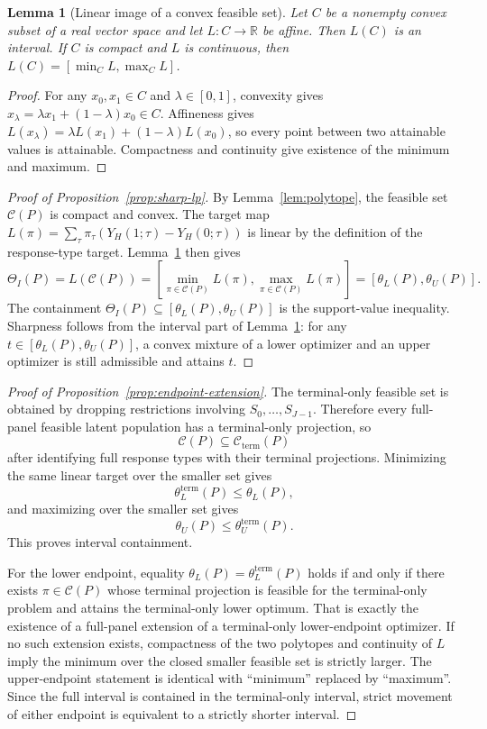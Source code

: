 \documentclass[11pt]{article}
\newcommand{\R}{\mathbb{R}}
\theoremstyle{definition}
\theoremstyle{plain}
\newtheorem{lemma}{Lemma}
\theoremstyle{remark}
\begin{document}
\begin{lemma}[Linear image of a convex feasible set]\label{lem:linear-image}
Let \(C\) be a nonempty convex subset of a real vector space and let \(L:C\to\R\) be affine.  Then \(L(C)\) is an interval.  If \(C\) is compact and \(L\) is continuous, then \(L(C)=[\min_C L,\max_C L]\).
\end{lemma}

\begin{proof}
For any \(x_0,x_1\in C\) and \(\lambda\in[0,1]\), convexity gives \(x_\lambda=\lambda x_1+(1-\lambda)x_0\in C\).  Affineness gives \(L(x_\lambda)=\lambda L(x_1)+(1-\lambda)L(x_0)\), so every point between two attainable values is attainable.  Compactness and continuity give existence of the minimum and maximum.
\end{proof}

\begin{proof}[Proof of Proposition~\ref{prop:sharp-lp}]
By Lemma~\ref{lem:polytope}, the feasible set \(\mathcal C(P)\) is compact and convex.  The target map \(L(\pi)=\sum_\tau\pi_\tau(Y_H(1;\tau)-Y_H(0;\tau))\) is linear by the definition of the response-type target.  Lemma~\ref{lem:linear-image} then gives
\[
  \Theta_I(P)
  =
  L(\mathcal C(P))
  =
  [\min_{\pi\in\mathcal C(P)}L(\pi),\max_{\pi\in\mathcal C(P)}L(\pi)]
  =
  [\theta_L(P),\theta_U(P)].
\]
The containment \(\Theta_I(P)\subseteq[\theta_L(P),\theta_U(P)]\) is the support-value inequality.  Sharpness follows from the interval part of Lemma~\ref{lem:linear-image}: for any \(t\in[\theta_L(P),\theta_U(P)]\), a convex mixture of a lower optimizer and an upper optimizer is still admissible and attains \(t\).
\end{proof}

\begin{proof}[Proof of Proposition~\ref{prop:endpoint-extension}]
The terminal-only feasible set is obtained by dropping restrictions involving \(S_0,\ldots,S_{J-1}\).  Therefore every full-panel feasible latent population has a terminal-only projection, so
\[
  \mathcal C(P)\subseteq \mathcal C_{\mathrm{term}}(P)
\]
after identifying full response types with their terminal projections.  Minimizing the same linear target over the smaller set gives
\[
  \theta_L^{\mathrm{term}}(P)
  \le
  \theta_L(P),
\]
and maximizing over the smaller set gives
\[
  \theta_U(P)
  \le
  \theta_U^{\mathrm{term}}(P).
\]
This proves interval containment.

For the lower endpoint, equality \(\theta_L(P)=\theta_L^{\mathrm{term}}(P)\) holds if and only if there exists \(\pi\in\mathcal C(P)\) whose terminal projection is feasible for the terminal-only problem and attains the terminal-only lower optimum.  That is exactly the existence of a full-panel extension of a terminal-only lower-endpoint optimizer.  If no such extension exists, compactness of the two polytopes and continuity of \(L\) imply the minimum over the closed smaller feasible set is strictly larger.  The upper-endpoint statement is identical with ``minimum'' replaced by ``maximum''.  Since the full interval is contained in the terminal-only interval, strict movement of either endpoint is equivalent to a strictly shorter interval.
\end{proof}
\end{document}
